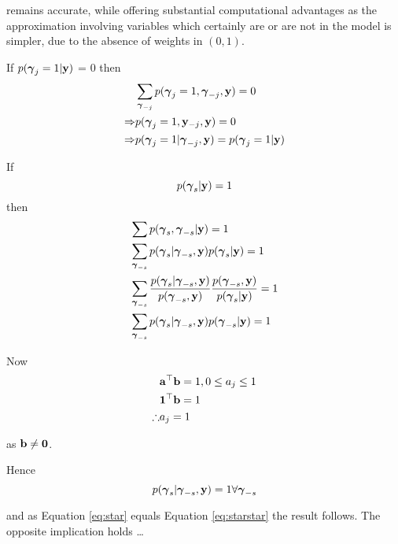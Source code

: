 \documentclass{amsart}[12pt]
\theoremstyle{definition}
\begin{document}
remains accurate, while offering substantial computational advantages as the approximation involving variables
which certainly are or are not in the model is simpler, due to the absence of weights in $(0, 1)$.

If $p({\boldsymbol \gamma}_j = 1|{\bf y})$ = 0
then
\begin{align*}
	            & \sum_{{\boldsymbol \gamma}_{-j}} p({\boldsymbol \gamma}_j=1, {\boldsymbol \gamma}_{-j}, {\bf y}) = 0 \\
	\Rightarrow & p({\boldsymbol \gamma}_j = 1, {\bf y}_{-j}, {\bf y}) = 0                       \\
	\Rightarrow & p({\boldsymbol \gamma}_j = 1| {\boldsymbol \gamma}_{-j}, {\bf y}) = p({\boldsymbol \gamma}_j=1|{\bf y})  \\
\end{align*}

If 
\begin{equation}\label{eq:star}
	p({\boldsymbol \gamma}_s|{\bf y}) = 1
\end{equation}
then
\begin{align*}
	  & \sum p({\boldsymbol \gamma}_s, {\boldsymbol \gamma}_{-s}|{\bf y}) = 1                                                                                            \\
	  & \sum_{{\boldsymbol \gamma}_{-s}} p({\boldsymbol \gamma}_s|{\boldsymbol \gamma}_{-s}, {\bf y}) p({\boldsymbol \gamma}_s|{\bf y}) = 1                                                            \\
	  & \sum_{{\boldsymbol \gamma}_{-s}} \frac{p({\boldsymbol \gamma}_s|{\boldsymbol \gamma}_{-s}, {\bf y})}{p({\boldsymbol \gamma}_{-s}, {\bf y})} \frac{p({\boldsymbol \gamma}_{-s}, {\bf y})}{ p({\boldsymbol \gamma}_s|{\bf y})} = 1 \\
	  & \sum_{{\boldsymbol \gamma}_{-s}} p({\boldsymbol \gamma}_s|{\boldsymbol \gamma}_{-s}, {\bf y}) p({\boldsymbol \gamma}_{-s}|{\bf y}) = 1                                                         \\
\end{align*}

Now
\begin{align*}
	           & {\bf a}^\top {\bf b} = 1, 0 \leq a_j \leq 1 \\
	           & {\bf 1}^\top {\bf b} = 1                  \\
	\therefore & a_j = 1                             \\
\end{align*}

as ${\bf b} \ne {\bf0}$.

Hence
\begin{equation}\label{eq:starstar}
	p({\boldsymbol \gamma}_s|{\boldsymbol \gamma}_{-s}, {\bf y}) = 1 \forall {\boldsymbol\gamma}_{-s}
\end{equation}

and as Equation \ref{eq:star} equals Equation \ref{eq:starstar} the result follows. The opposite implication
holds \ldots



\end{document}
